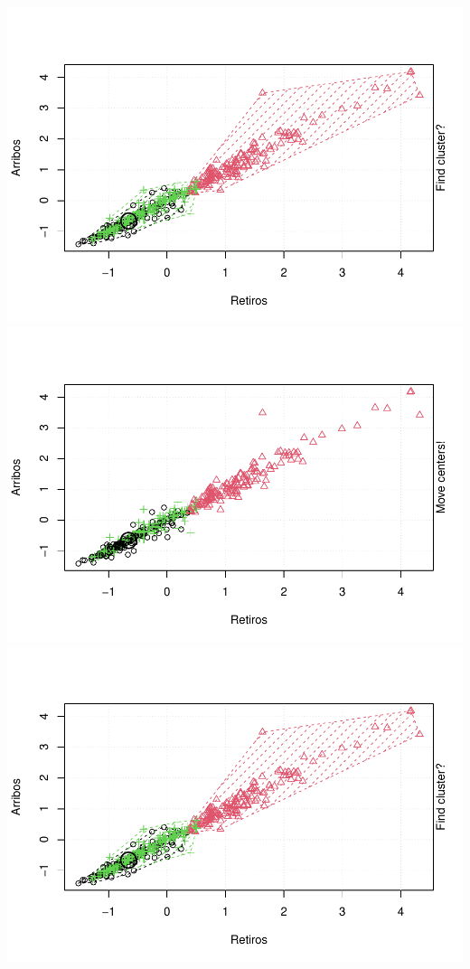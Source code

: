 \documentclass[
]{article}
\begin{document}
\includegraphics{Ecobici_files/figure-latex/unnamed-chunk-12-16.pdf}
\includegraphics{Ecobici_files/figure-latex/unnamed-chunk-12-17.pdf}
\includegraphics{Ecobici_files/figure-latex/unnamed-chunk-12-18.pdf}
\end{document}
